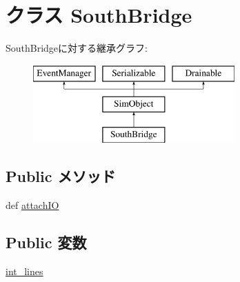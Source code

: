 \hypertarget{classSouthBridge_1_1SouthBridge}{
\section{クラス SouthBridge}
\label{classSouthBridge_1_1SouthBridge}
}
SouthBridgeに対する継承グラフ:\begin{figure}[H]
\begin{center}
\leavevmode
\includegraphics[height=3cm]{classSouthBridge_1_1SouthBridge}
\end{center}
\end{figure}
\subsection*{Public メソッド}
\begin{DoxyCompactItemize}
\item 
def \hyperlink{classSouthBridge_1_1SouthBridge_ac750675f6d6de3ad52f8c5b03ee45a65}{attachIO}
\end{DoxyCompactItemize}
\subsection*{Public 変数}
\begin{DoxyCompactItemize}
\item 
\hyperlink{classSouthBridge_1_1SouthBridge_ab5dd0892b4cf4b26fd1bce19b15b1791}{int\_\-lines}
\end{DoxyCompactItemize}
